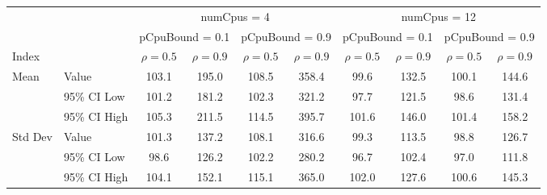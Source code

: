 \begin{tabular}{llc|c|c|c|c|c|c|c}
\toprule
& & \multicolumn{4}{c|}{numCpus = 4} & \multicolumn{4}{c}{numCpus = 12} \\
& & \multicolumn{2}{c|}{pCpuBound = 0.1} & \multicolumn{2}{c|}{pCpuBound = 0.9} & \multicolumn{2}{c|}{pCpuBound = 0.1} & \multicolumn{2}{c}{pCpuBound = 0.9} \\
Index & & $\rho = 0.5$ & $\rho = 0.9$ & $\rho = 0.5$ & $\rho = 0.9$ & $\rho = 0.5$ & $\rho = 0.9$ & $\rho = 0.5$ & $\rho = 0.9$ \\
\midrule
\multirow{3}{*}{Mean} & Value & 103.1 & 195.0 & 108.5 & 358.4 & 99.6 & 132.5 & 100.1 & 144.6 \\
& 95\% CI Low & 101.2 & 181.2 & 102.3 & 321.2 & 97.7 & 121.5 & 98.6 & 131.4 \\
& 95\% CI High & 105.3 & 211.5 & 114.5 & 395.7 & 101.6 & 146.0 & 101.4 & 158.2 \\
\midrule
\multirow{3}{*}{Std Dev} & Value & 101.3 & 137.2 & 108.1 & 316.6 & 99.3 & 113.5 & 98.8 & 126.7 \\
& 95\% CI Low & 98.6 & 126.2 & 102.2 & 280.2 & 96.7 & 102.4 & 97.0 & 111.8 \\
& 95\% CI High & 104.1 & 152.1 & 115.1 & 365.0 & 102.0 & 127.6 & 100.6 & 145.3 \\
\bottomrule
\end{tabular}